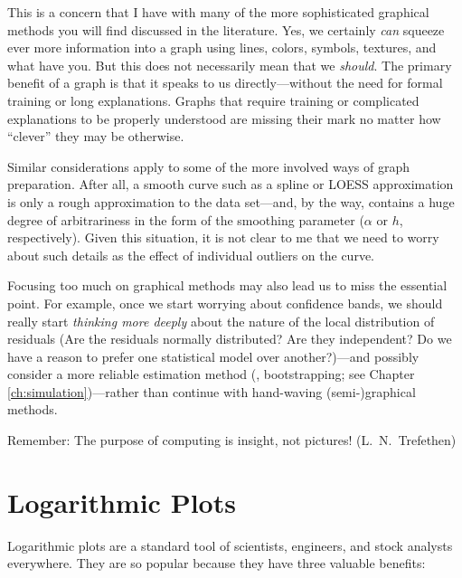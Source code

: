 This is a concern that I have with many of the more sophisticated
graphical methods you will find discussed in the literature. Yes, we
certainly \emph{can} squeeze ever more information into a graph using
lines, colors, symbols, textures, and what have you. But this does not
necessarily mean that we \emph{should}. The primary benefit of a graph
is that it speaks to us directly---without the need for formal
training or long explanations. Graphs that require training or
complicated explanations to be properly understood are missing their
mark no matter how ``clever'' they may be otherwise.

Similar considerations apply to some of the more involved ways of
graph preparation. After all, a smooth curve such as a spline or LOESS
approximation is only a rough approximation to the data set---and, by
the way, contains a huge degree of arbitrariness in the form of the
smoothing parameter ($\alpha$ or $h$, respectively). Given this
situation, it is not clear to me that we need to worry about such
details as the effect of individual outliers on the curve.

Focusing too much on graphical methods may also lead us to miss the
essential point. For example, once we start worrying about confidence
bands, we should really start \emph{thinking more deeply} about the
nature of the local distribution of residuals (Are the residuals
normally distributed? Are they independent? Do we have a reason to
prefer one statistical model over another?)---and possibly consider a
more reliable estimation method (\eg, bootstrapping; see Chapter
\ref{ch:simulation})---rather than continue with hand-waving
(semi-)graphical methods.

Remember: The purpose of computing is insight, not pictures! (L.\ N.\
Trefethen)




\section{Logarithmic Plots}

  
Logarithmic plots are a standard tool of scientists, engineers, and
stock analysts everywhere. They are so popular because they
have three valuable benefits:

